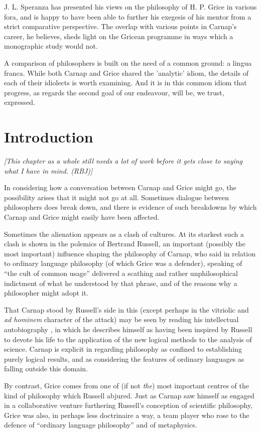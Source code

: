 \documentclass[10pt,titlepage]{book}
\begin{document}
J. L. Speranza has presented his views on the philosophy of H. P. Grice in  
various fora, and is happy to have been able to further his exegesis of his 
 mentor from a strict comparative perspective. The overlap with various  
points in Carnap's career, he believes, sheds light on the Gricean programme 
in  ways which a monographic study would not. 
 
A comparison of philosophers is built on the need of a common ground: a  
lingua franca.
While both Carnap and Grice shared the 'analytic' idiom, the  
details of each of their idiolects is worth examining. And it is in this 
common  idiom that progress, as regards the second goal of our endeavour, will  
be, we trust, expressed.  

\chapter{Introduction}

{\it [This chapter as a whole still needs a lot of work before it gets close to saying what I have in mind. (RBJ)]}

In considering how a conversation between Carnap and Grice might go, the possibility arises that it might not go at all.
Sometimes dialogue between philosophers does break down, and there is evidence of such breakdowns by which Carnap and Grice might easily have been affected.

Sometimes the alienation appears as a clash of cultures.
At its starkest such a clash is shown in the polemics of Bertrand Russell, an important (possibly the most important) influence shaping the philosophy of Carnap, who said in relation to ordinary language philosophy (of which Grice was a defender), speaking of ``the cult of common usage'' delivered a scathing and rather unphilosophical indictment of what he understood by that phrase, and of the reasons why a philosopher might adopt it.

That Carnap stood by Russell's side in this (except perhaps in the vitriolic and \emph{ad hominem} character of the attack) may be seen by reading his intellectual autobiography \cite{carnap63a}, in which he describes himself as having been inspired by Russell to devote his life to the application of the new logical methods to the analysis of science.
Carnap is explicit in regarding philosophy as confined to establishing purely logical results, and as considering the features of ordinary languages as falling outside this domain.

By contrast, Grice comes from one of (if not {\it the}) most important centres of the kind of philosophy which Russell abjured.
Just as Carnap saw himself as engaged in a collaborative venture furthering Russell's conception of scientific philosophy, Grice was also, in perhaps less doctrinaire a way, a team player who rose to the defence of ``ordinary language philosophy'' and of metaphysics.
\end{document}
